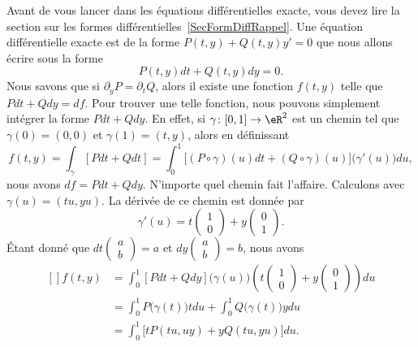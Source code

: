 Avant de vous lancer dans les équations différentielles exacte, vous devez lire la section sur les formes différentielles~\ref{SecFormDiffRappel}. Une équation différentielle exacte est de la forme \( P(t,y)+Q(t,y)y'=0\) que nous allons écrire sous la forme
\begin{equation}		\label{EqExacteDiff}
	P(t,y)dt+Q(t,y)dy=0.
\end{equation}
Nous savons que si \( \partial_yP=\partial_tQ\), alors il existe une fonction \( f(t,y)\) telle que \( Pdt+Qdy=df\). Pour trouver une telle fonction, nous pouvons simplement intégrer la forme \( Pdt+Qdy\). En effet, si \( \gamma\colon [0,1]\to \eR^2\) est un chemin tel que \( \gamma(0)=(0,0)\) et \( \gamma(1)=(t,y)\), alors en définissant
\begin{equation}
	f(t,y)=\int_{\gamma}[Pdt+Qdt]=\int_{0}^1\big[ (P\circ\gamma)(u)dt+(Q\circ\gamma)(u) \big]\big( \gamma'(u) \big)du,
\end{equation}
nous avons \( df=Pdt+Qdy\). N'importe quel chemin fait l'affaire. Calculons avec \( \gamma(u)=(tu,yu)\). La dérivée de ce chemin est donnée par
\begin{equation}
	\gamma'(u)=t\begin{pmatrix}
		1 \\
		0
	\end{pmatrix}+y\begin{pmatrix}
		0 \\
		1
	\end{pmatrix}.
\end{equation}
Étant donné que \( dt\begin{pmatrix}
	a \\
	b
\end{pmatrix}=a\) et \( dy\begin{pmatrix}
	a \\
	b
\end{pmatrix}=b\), nous avons
\begin{equation}
	\begin{aligned}[]
		f(t,y) & =\int_0^1[Pdt+Qdy]\big( \gamma(u) \big)\left( t\begin{pmatrix}
				                                                        1 \\
				                                                        0
			                                                        \end{pmatrix}+y\begin{pmatrix}
				                                                                       0 \\
				                                                                       1
			                                                                       \end{pmatrix} \right)du \\
		       & =\int_0^1P\big( \gamma(t) \big)tdu+\int_0^1Q\big( \gamma(t) \big)ydu                  \\
		       & =\int_0^1\big[ tP(tu,uy)+yQ(tu,yu) \big]du.
	\end{aligned}
\end{equation}
